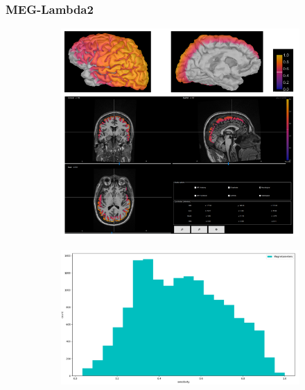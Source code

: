 \documentclass{beamer}
\numberwithin{figure}{section}
\numberwithin{equation}{section}
\begin{document}
\section{}
\begin{frame}
 \frametitle{MEG-Lambda2 }
  

 	\begin{figure}[h]
        \begin{subfigure}[h]{0.53\linewidth} 
            \includegraphics[width=\linewidth]{pictures/meg2}
            \label{fig:rdf_graph}
        \end{subfigure}       
        \begin{subfigure}[h]{0.45\linewidth} 
            \includegraphics[width=\linewidth]{pictures/HISTmeg1.png}
            \label{fig:rdfs_graph}
        \end{subfigure}
    \end{figure}

  
\end{frame}
\end{document}
